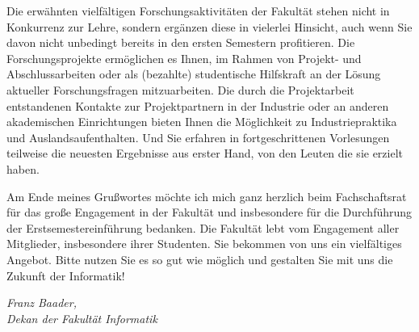 Die erwähnten vielfältigen Forschungsaktivitäten der Fakultät stehen nicht in Konkurrenz zur Lehre, sondern ergänzen diese in vielerlei Hinsicht, auch wenn Sie davon nicht unbedingt bereits in den ersten Semestern profitieren. Die Forschungsprojekte ermöglichen es Ihnen, im Rahmen von Projekt- und Abschlussarbeiten oder als (bezahlte) studentische Hilfskraft an der Lösung aktueller Forschungsfragen mitzuarbeiten. Die durch die Projektarbeit entstandenen Kontakte zur Projektpartnern in der Industrie oder an anderen akademischen Einrichtungen bieten Ihnen die Möglichkeit zu Industriepraktika und Auslandsaufenthalten. Und Sie erfahren in fortgeschrittenen Vorlesungen teilweise die neuesten Ergebnisse aus erster Hand, von den Leuten die sie erzielt haben.

Am Ende meines Grußwortes möchte ich mich ganz herzlich beim Fachschaftsrat für das große Engagement in der Fakultät und insbesondere für die Durchführung der Erstsemestereinführung bedanken. Die Fakultät lebt vom Engagement aller Mitglieder, insbesondere ihrer Studenten. Sie bekommen von uns ein vielfältiges Angebot. Bitte nutzen Sie es so gut wie möglich und gestalten Sie mit uns die Zukunft der Informatik!

\textit{Franz Baader,\\
Dekan der Fakultät Informatik}
